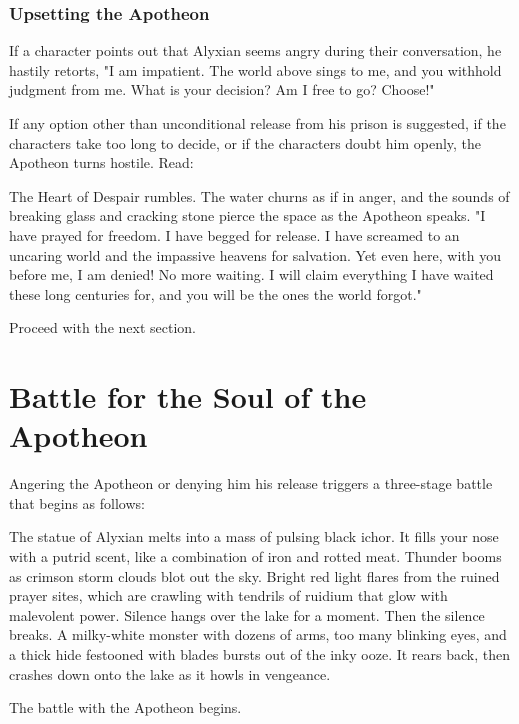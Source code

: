 \documentclass[a4paper, 11pt, bg=full, twocolumn, nooutline]{dndbook}
\begin{document}
\subsubsection{Upsetting the Apotheon}

If a character points out that Alyxian seems angry during their conversation, he hastily retorts, "I am impatient. The world above sings to me, and you withhold judgment from me. What is your decision? Am I free to go? Choose!"

If any option other than unconditional release from his prison is suggested, if the characters take too long to decide, or if the characters doubt him openly, the Apotheon turns hostile. Read:

\begin{DndReadAloud}
The Heart of Despair rumbles. The water churns as if in anger, and the sounds of breaking glass and cracking stone pierce the space as the Apotheon speaks. "I have prayed for freedom. I have begged for release. I have screamed to an uncaring world and the impassive heavens for salvation. Yet even here, with you before me, I am denied! No more waiting. I will claim everything I have waited these long centuries for, and you will be the ones the world forgot."
\end{DndReadAloud}

Proceed with the next section.
\section{Battle for the Soul of the Apotheon}

Angering the Apotheon or denying him his release triggers a three-stage battle that begins as follows:

\begin{DndReadAloud}
The statue of Alyxian melts into a mass of pulsing black ichor. It fills your nose with a putrid scent, like a combination of iron and rotted meat. Thunder booms as crimson storm clouds blot out the sky. Bright red light flares from the ruined prayer sites, which are crawling with tendrils of ruidium that glow with malevolent power. Silence hangs over the lake for a moment.
Then the silence breaks. A milky-white monster with dozens of arms, too many blinking eyes, and a thick hide festooned with blades bursts out of the inky ooze. It rears back, then crashes down onto the lake as it howls in vengeance.
\end{DndReadAloud}

The battle with the Apotheon begins.
\end{document}
